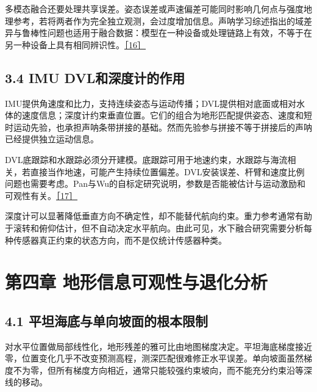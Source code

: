 多模态融合还要处理共享误差。姿态误差或声速偏差可能同时影响几何点与强度地理参考，若将两者作为完全独立观测，会过度增加信息。声呐学习综述指出的域差异与鲁棒性问题也适用于融合数据：模型在一种设备或处理链路上有效，不等于在另一种设备上具有相同辨识性。\href{https://arxiv.org/abs/2412.11840}{［16］}

\hypertarget{imu-dvlux548cux6df1ux5ea6ux8ba1ux7684ux4f5cux7528}{%
\subsection{3.4 IMU DVL和深度计的作用}\label{imu-dvlux548cux6df1ux5ea6ux8ba1ux7684ux4f5cux7528}}

IMU提供角速度和比力，支持连续姿态与运动传播；DVL提供相对底面或相对水体的速度信息；深度计约束垂直位置。它们的组合为地形匹配提供姿态、速度和短时运动先验，也承担声呐条带拼接的基础。然而先验参与拼接不等于拼接后的声呐已经提供独立运动信息。

DVL底跟踪和水跟踪必须分开建模。底跟踪可用于地速约束，水跟踪与海流相关，若直接当作地速，可能产生持续位置偏差。DVL安装误差、杆臂和速度比例问题也需要考虑。Pan与Wu的自标定研究说明，参数是否能被估计与运动激励和可观性有关。\href{https://arxiv.org/abs/1509.02054}{［17］}

深度计可以显著降低垂直方向不确定性，却不能替代航向约束。重力参考通常有助于滚转和俯仰估计，但不自动决定水平航向。由此可见，水下融合研究需要分析每种传感器真正约束的状态方向，而不是仅统计传感器种类。

\hypertarget{ux7b2cux56dbux7ae0-ux5730ux5f62ux4fe1ux606fux53efux89c2ux6027ux4e0eux9000ux5316ux5206ux6790}{%
\section{第四章 地形信息可观性与退化分析}\label{ux7b2cux56dbux7ae0-ux5730ux5f62ux4fe1ux606fux53efux89c2ux6027ux4e0eux9000ux5316ux5206ux6790}}

\hypertarget{ux5e73ux5766ux6d77ux5e95ux4e0eux5355ux5411ux5761ux9762ux7684ux6839ux672cux9650ux5236}{%
\subsection{4.1 平坦海底与单向坡面的根本限制}\label{ux5e73ux5766ux6d77ux5e95ux4e0eux5355ux5411ux5761ux9762ux7684ux6839ux672cux9650ux5236}}

对水平位置做局部线性化，地形残差的雅可比由地图梯度决定。平坦海底梯度接近零，位置变化几乎不改变预测高程，测深匹配很难修正水平误差。单向坡面虽然梯度不为零，但所有梯度方向相近，通常只能较强约束坡向，而不能充分约束沿等深线的移动。

